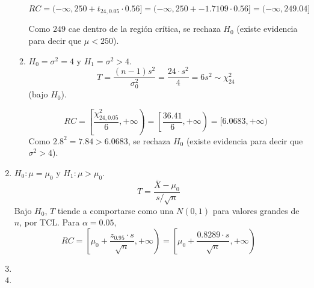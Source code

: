 \begin{enumerate}
\begin{enumerate}
				$$RC = (-\infty, 250 + t_{24,0.05}\cdot 0.56] = (-\infty, 250 + -1.7109\cdot 0.56] = (-\infty, 249.04]$$
				
				Como $249$ cae dentro de la región crítica, se rechaza $H_0$ (existe evidencia para decir que $\mu < 250$).
			\item
				$H_0 = \sigma^2 = 4$ y $H_1 = \sigma^2 > 4$.
				$$T = \frac{(n-1)s^2}{\sigma_0^2} = \frac{24\cdot s^2}{4} = 6s^2 \sim \chi^2_{24}$$ (bajo $H_0$).
				
				$$RC = \left[\frac{\chi^2_{24, 0.05}}{6}, +\infty\right) = \left[\frac{36.41}{6}, +\infty\right) = [6.0683, +\infty)$$
				Como $2.8^2 = 7.84 > 6.0683$, se rechaza $H_0$ (existe evidencia para decir que $\sigma^2 > 4$).
		\end{enumerate}
		
	\item
		$H_0: \mu = \mu_0$ y $H_1: \mu > \mu_0$.
		$$T=\frac{\overline{X}-\mu_0}{s/\sqrt{n}}$$
		Bajo $H_0$, $T$ tiende a comportarse como una $N(0,1)$ para valores grandes de $n$, por TCL.
		Para $\alpha = 0.05$,
		$$RC = \left[\mu_0 + \frac{z_{0.95}\cdot s}{\sqrt{n}} , +\infty\right) = \left[\mu_0 + \frac{0.8289\cdot s}{\sqrt{n}}, +\infty\right)$$
		
	\item
		
	\item
		
\end{enumerate}
